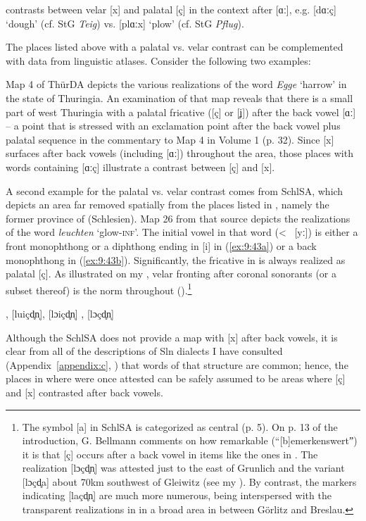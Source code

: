 contrasts between velar [x] and palatal [ç] in the context after [ɑː], e.g. [dɑːç] ‘dough’ (cf. StG \textit{Teig}) vs. [plɑːx] ‘plow’ (cf. StG \textit{Pflug}).

The places listed above with a palatal vs. velar contrast can be complemented with data from linguistic atlases. Consider the following two examples:

Map 4 of ThürDA depicts the various realizations of the word \textit{Egge} ‘harrow’ in the state of Thuringia. An examination of that map reveals that there is a small part of west Thuringia with a palatal fricative ([ç] or [ʝ]) after the back vowel [ɑː] -- a point that is stressed with an exclamation point after the back vowel plus palatal sequence in the commentary to Map 4 in Volume 1 (p. 32). Since [x] surfaces after back vowels (including [ɑː]) throughout the area, those places with words containing [ɑːç] illustrate a contrast between [ç] and [x].

A second example for the palatal vs. velar contrast comes from SchlSA, which depicts an area far removed spatially from the places listed in , namely the former province of  (Schlesien). Map 26 from that source depicts the realizations of the word \textit{leuchten} ‘glow-\textsc{inf}’. The initial vowel in that word (<~ [yː]) is either a front monophthong or a diphthong ending in [i] in (\ref{ex:9:43a}) or a back monophthong in (\ref{ex:9:43b}). Significantly, the fricative in  is always realized as palatal [ç]. As illustrated on my , velar fronting after coronal sonorants (or a subset thereof) is the norm throughout  ().\footnote{{The symbol [a] in SchlSA is categorized as central (p. 5). On p. 13 of the introduction, G. Bellmann comments on how remarkable (“[b]emerkenswertˮ) it is that [ç] occurs after a back vowel in items like the ones in . The realization  [lɔçd̥n̩] was attested just to the east of Grunlich and the variant [lɔçd̥a] about 70km southwest of Gleiwitz (see my ). By contrast, the markers indicating [laçd̥n̩] are much more numerous, being interspersed with the transparent realizations in  in a broad area in between Görlitz and Breslau.}}

\ea%
\label{ex:9:43}
\ea\label{ex:9:43a}\relax  [lɛçd̥n̩], [luiçd̥n̩], [lɔiçd̥n̩]
\ex\label{ex:9:43b}\relax  [laçd̥n̩], [lɔçd̥n̩]
\z 
\z 

Although the SchlSA does not provide a map with [x] after back vowels, it is clear from all of the descriptions of Sln dialects I have consulted (Appendix~\ref{appendix:c}, ) that words of that structure are common; hence, the places in  where  were once attested can be safely assumed to be areas where [ç] and [x] contrasted after back vowels.

